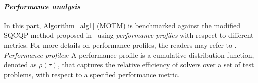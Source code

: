 \documentclass[amsa]{ipart}
\theoremstyle{plain}
\numberwithin{equation}{section}
\begin{document}
\paragraph*{{\bf \em Performance analysis}}
In this part, Algorithm~\ref{alg1} (MOTM) is benchmarked against the modified SQCQP method proposed in~\cite{ansary2021sqcqp} using \textit{performance profiles} with respect to different metrics. For more details on performance profiles, the readers may refer to \cite{ansary2020sequential, fliege2016sqp, more2009benchmarking, zitzler2003performance}. \\
\textit{Performance profiles:} A performance profile is a cumulative distribution function, denoted as $\rho(\tau)$, that captures the relative efficiency of solvers over a set of test problems, with respect to a specified performance metric.\\
\end{document}
